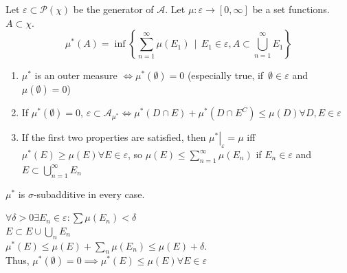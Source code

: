 \documentclass[a4paper]{article}
\numberwithin{lecref}{section}
\theoremstyle{break}
\newcommand{\SetDef}[2]{\left\{#1\,\mid\,#2\right\}}
\begin{document}
\begin{theorem}
  Let $\varepsilon \subset \mathcal P(\chi)$ be the generator of $\mathcal A$.
  Let $\mu: \varepsilon \to [0, \infty]$ be a set functions. $A \subset \chi$.
  \[ \mu^*(A) = \inf\SetDef{\sum_{n=1}^\infty \mu(E_1)}{E_1 \in \varepsilon, A \subset \bigcup_{n=1}^\infty E_1} \]
  \begin{enumerate}
    \item $\mu^*$ is an outer measure $\iff \mu^*(\emptyset) = 0$ (especially true, if $\, \emptyset \in \varepsilon$ and $\mu(\emptyset) = 0$)
    \item If $\mu^*(\emptyset) = 0$, $\varepsilon \subset \mathcal A_{\mu^*} \iff \mu^*(D \cap E) + \mu^*(D \cap E^C) \leq \mu(D) \forall D, E \in \varepsilon$
    \item If the first two properties are satisfied, then $\left.\mu^*\right|_\varepsilon = \mu$ iff $\mu^*(E) \geq \mu(E) \forall E \in \varepsilon$, so $\mu(E) \leq \sum_{n=1}^\infty \mu(E_n)$ if $E_n \in \varepsilon$ and $E \subset \bigcup_{n=1}^\infty E_n$
  \end{enumerate}
\end{theorem}

$\mu^*$ is $\sigma$-subadditive in every case.

$\forall \delta > 0 \exists E_n \in \varepsilon: \sum \mu(E_n) < \delta$ \\
$E \subset E \cup \bigcup_n E_n$ \\
$\mu^*(E) \leq \mu(E) + \sum_n \mu(E_n) \leq \mu(E) + \delta$. \\
Thus, $\mu^*(\emptyset) = 0 \implies \mu^*(E) \leq \mu(E) \forall E \in \varepsilon$
\end{document}

